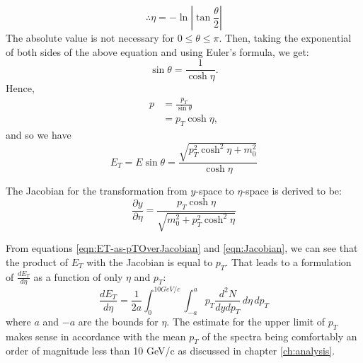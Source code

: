 \begin{equation}\label{eqn:pseudorapidity}
\therefore \eta = -\ln{\left|{\tan{\frac{\theta}{2}}}\right|}
\end{equation}
The absolute value is not necessary for $0 \leq \theta  \leq \pi$. Then, taking the exponential of both sides of the above equation and using Euler's formula, we get:
\begin{equation}
\sin\theta = \frac{1}{\cosh\eta}.
\end{equation}
Hence,
\begin{align*}
p &= \frac{p_{T}}{\sin\theta}\\
&= p_{T}\cosh\eta,
\end{align*}
and so we have
\begin{equation}\label{eqn:ET-as-pTOverJacobian}
E_{T} = E\sin\theta = \frac{\sqrt{p_{T}^2\cosh^2\eta+m_{0}^2}}{\cosh\eta} 
\end{equation}

The Jacobian for the transformation from $y$-space to $\eta$-space is derived to be:
\begin{equation}\label{eqn:Jacobian}
\frac{\partial y}{\partial \eta} = \frac{p_{T}\cosh\eta}{\sqrt{m_{0}^2+p_{T}^2\cosh^2\eta}}
\end{equation}

From equations \ref{eqn:ET-as-pTOverJacobian} and \ref{eqn:Jacobian}, we can see that the product of $E_{T}$ with the Jacobian is equal to $p_{T}$. That leads to a formulation of $\frac{dE_{T}}{d\eta}$ as a function of only $\eta$ and $p_{T}$:
\begin{equation}\label{eqn:dETOverdEta}
\frac{dE_{T}}{d\eta} = \frac{1}{2a}\int_{0}^{10GeV/c}\int_{-a}^{a} p_{T}\frac{d^{2}N}{dydp_{T}} \,d\eta\,dp_{T}
\end{equation}
where $a$ and $-a$ are the bounds for $\eta$. The estimate for the upper limit of $p_T{}$ makes sense in accordance with the mean $p_{T}$ of the spectra being comfortably an order of magnitude less than 10 GeV/c as discussed in chapter \ref{ch:analysis}.

